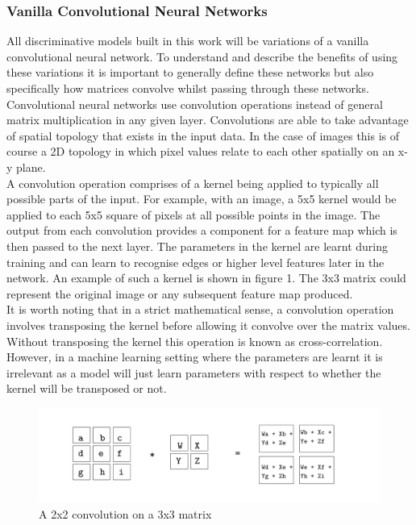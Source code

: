 \documentclass{article}
\begin{document}
\subsubsection{Vanilla Convolutional Neural Networks}
All discriminative models built in this work will be variations of a vanilla convolutional neural network. To understand and describe the benefits of using these variations it is important to generally define these networks but also specifically how matrices convolve whilst passing through these networks.\\

Convolutional neural networks use convolution operations instead of general matrix multiplication in any given layer. Convolutions are able to take advantage of spatial topology that exists in the input data. In the case of images this is of course a 2D topology in which pixel values relate to each other spatially on an x-y plane.\\

A convolution operation comprises of a kernel being applied to  typically all possible parts of the input. For example, with an image, a 5x5 kernel would be applied to each 5x5 square of pixels at all possible points in the image. The output from each convolution provides a component for a feature map which is then passed to the next layer. The parameters in the kernel are learnt during training and can learn to recognise edges or higher level features later in the network. An example of such a kernel is shown in figure 1. The 3x3 matrix could represent the original image or any subsequent feature map produced.\\

It is worth noting that in a strict mathematical sense, a convolution operation involves transposing the kernel before allowing it convolve over the matrix values. Without transposing the kernel this operation is known as cross-correlation. However, in a machine learning setting where the parameters are learnt it is irrelevant as a model will just learn parameters with respect to whether the kernel will be transposed or not. \\

\begin{figure}
  \includegraphics[width=\linewidth]{convolutionexample.pdf}
  \caption{A 2x2 convolution on a 3x3 matrix}
  \label{fig:convolution}
\end{figure}
\end{document}
